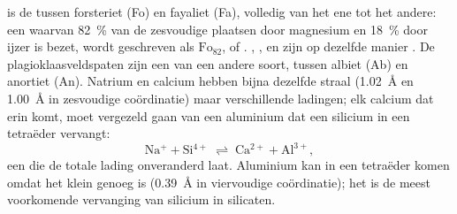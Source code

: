  is de  tussen forsteriet  (Fo) en fayaliet  (Fa), volledig van het ene
 tot het andere: een  waarvan \qty{82}{\percent} van de zesvoudige plaatsen door magnesium en \qty{18}{\percent}
door ijzer is bezet, wordt geschreven als $\text{Fo}_{82}$, of . , ,  en
 zijn op dezelfde manier . De plagioklaasveldspaten zijn een  van een andere soort, tussen
albiet  (Ab) en anortiet  (An). Natrium en calcium hebben bijna dezelfde straal
(\qty{1.02}{\angstrom} en \qty{1.00}{\angstrom} in zesvoudige coördinatie) maar verschillende ladingen; elk calcium dat erin
komt, moet vergezeld gaan van een aluminium dat een silicium in een tetraëder vervangt:
\[
  \mathrm{Na^{+}} + \mathrm{Si^{4+}} \;\rightleftharpoons\; \mathrm{Ca^{2+}} + \mathrm{Al^{3+}},
\]
een  die de totale lading onveranderd laat.
Aluminium kan in een tetraëder komen omdat het klein genoeg is (\qty{0.39}{\angstrom} in viervoudige coördinatie); het
is de meest voorkomende vervanging van silicium in silicaten.

